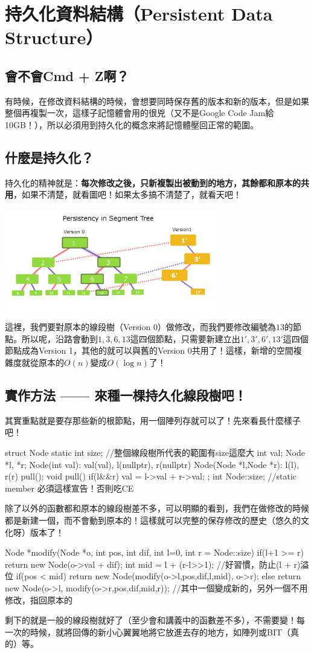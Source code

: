 	\section{持久化資料結構（Persistent Data Structure）}
		\subsection{會不會Cmd + Z啊？}
			有時候，在修改資料結構的時候，會想要同時保存舊的版本和新的版本，但是如果整個再複製一次，這樣子記憶體會用的很兇（又不是Google Code Jam給10GB！），所以必須用到持久化的概念來將記憶體壓回正常的範圍。
		\subsection{什麼是持久化？}
			持久化的精神就是：\textbf{每次修改之後，只新複製出被動到的地方，其餘都和原本的共用}，如果不清楚，就看圖吧！如果太多搞不清楚了，就看天吧！
			\begin{center}
				\includegraphics*[width = 0.7\textwidth]{images/persistent}
			\end{center}
			這裡，我們要對原本的線段樹（Version 0）做修改，而我們要修改編號為$13$的節點。所以呢，沿路會動到$1, 3, 6, 13$這四個節點，只需要新建立出$1', 3', 6', 13'$這四個節點成為Version 1，其他的就可以與舊的Version 0共用了！這樣，新增的空間複雜度就從原本的$O(n)$變成$O(\log n)$了！
		\subsection{實作方法 —— 來種一棵持久化線段樹吧！}
			其實重點就是要存那些新的根節點，用一個陣列存就可以了！先來看長什麼樣子吧！
			\begin{C++}
struct Node{
	static int size; //整個線段樹所代表的範圍有size這麼大
	int val;
	Node *l, *r;
	Node(int val): val(val), l(nullptr), r(nullptr){}
	Node(Node *l,Node *r): l(l), r(r){ pull(); }
	void pull() { if(l&&r) val = l->val + r->val; }
};
int Node::size; //static member 必須這樣宣告！否則吃CE
			\end{C++}
			 除了以外的函數都和原本的線段樹差不多，可以明顯的看到，我們在做修改的時候都是新建一個，而不會動到原本的！這樣就可以完整的保存修改的歷史（悠久的文化呀）版本了！
			 \begin{C++}
Node *modify(Node *o, int pos, int dif, 
					   int l=0, int r = Node::size){ 
	if(l+1 >= r) return new Node(o->val + dif);
	int mid = l + (r-l>>1); //好習慣，防止(l + r)溢位
	if(pos < mid)
		return new Node(modify(o->l,pos,dif,l,mid), o->r); 
	else 
		return new Node(o->l, modify(o->r,pos,dif,mid,r));
	//其中一個變成新的，另外一個不用修改，指回原本的
}
			 \end{C++}
			剩下的就是一般的線段樹就好了（至少會和講義中的函數差不多），不需要變！每一次的時候，就將回傳的新小心翼翼地將它放進去存的地方，如陣列或BIT（真的）等。
